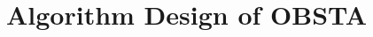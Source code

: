 \documentclass[10pt, conference, letterpaper]{IEEEtran}
\theoremstyle{definition}
\begin{document}

\section{Algorithm Design of OBSTA} \label{sec: algorithm}



\end{document}
